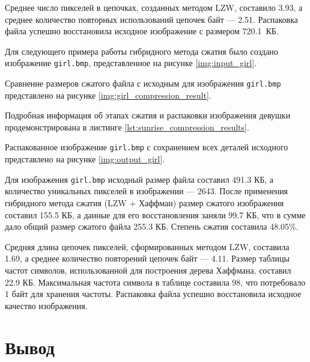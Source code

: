 Среднее число пикселей в цепочках, созданных методом LZW, составило 3.93, а среднее количество повторных использований цепочек байт --- 2.51. Распаковка файла успешно восстановила исходное изображение с размером 720.1~КБ.

\clearpage


Для следующего примера работы гибридного метода сжатия было создано изображение \texttt{girl.bmp}, представленное на рисунке \ref{img:input_girl}.


Сравнение размеров сжатого файла с исходным для изображения \texttt{girl.bmp} представлено на рисунке \ref{img:girl_compression_result}. 


Подробная информация об этапах сжатия и распаковки изображения девушки продемонстрирована в листинге \ref{lst:sunrise_compression_results}.


Распакованное изображение \texttt{girl.bmp} с сохранением всех деталей исходного представлено на рисунке \ref{img:output_girl}.


Для изображения \texttt{girl.bmp} исходный размер файла составил 491.3 КБ, а количество уникальных пикселей в изображении --- 2643. После применения гибридного метода сжатия (LZW + Хаффман) размер сжатого изображения составил 155.5 КБ, а данные для его восстановления заняли 99.7 КБ, что в сумме дало общий размер сжатого файла 255.3 КБ. Степень сжатия составила 48.05\%.

Средняя длина цепочек пикселей, сформированных методом LZW, составила 1.69, а среднее количество повторений цепочек байт --- 4.11. Размер таблицы частот символов, использованной для построения дерева Хаффмана, составил 22.9 КБ. Максимальная частота символа в таблице составила 98, что потребовало 1 байт для хранения частоты. Распаковка файла успешно восстановила исходное качество изображения.

\section*{Вывод}

